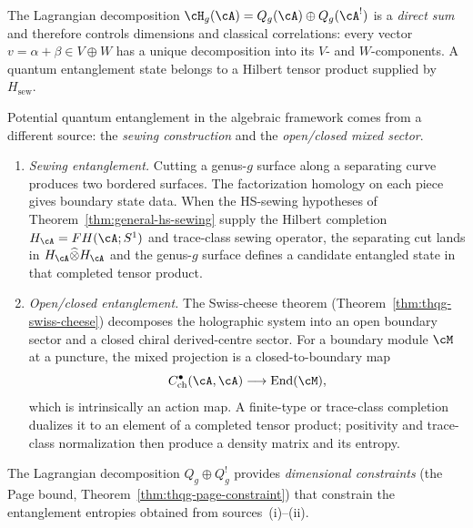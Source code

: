 \begin{remark}
\label{rem:thqg-two-entanglements}
The Lagrangian decomposition
$\cH_g(\cA) = Q_g(\cA) \oplus Q_g(\cA^!)$
is a \emph{direct sum} and therefore controls dimensions and
classical correlations:
every vector $v = \alpha+\beta \in V\oplus W$ has a unique
decomposition into its $V$- and $W$-components.  A quantum
entanglement state belongs to a Hilbert tensor product supplied by
$H_{\mathrm{sew}}$.

Potential quantum entanglement in the algebraic framework
comes from a different source: the \emph{sewing construction}
and the \emph{open/closed mixed sector}.
\begin{enumerate}[label=\textup{(\roman*)}]
\item \emph{Sewing entanglement.}
 Cutting a genus-$g$ surface along a separating curve
 produces two bordered surfaces. The factorization homology
 on each piece gives boundary state data.  When the HS-sewing
 hypotheses of Theorem~\ref{thm:general-hs-sewing} supply the
 Hilbert completion $H_\cA=FH(\cA;S^1)$ and trace-class sewing
 operator, the separating cut lands in
 $H_\cA\widehat{\otimes}H_\cA$ and the genus-$g$ surface defines a
 candidate entangled state in that completed tensor product.

\item \emph{Open/closed entanglement.}
 The Swiss-cheese theorem
 (Theorem~\ref{thm:thqg-swiss-cheese}) decomposes the
 holographic system into an open boundary sector and a closed
 chiral derived-centre sector.  For a boundary module $\cM$ at
 a puncture, the mixed projection is a closed-to-boundary map
 \[
 C^\bullet_{\mathrm{ch}}(\cA,\cA)\longrightarrow
 \operatorname{End}(\cM),
 \]
 which is intrinsically an action map.  A finite-type or trace-class
 completion dualizes it to an element of a completed tensor product;
 positivity and trace-class normalization then produce a density
 matrix and its entropy.
\end{enumerate}
The Lagrangian decomposition $Q_g \oplus Q_g^!$ provides
\emph{dimensional constraints} (the Page bound,
Theorem~\ref{thm:thqg-page-constraint}) that constrain
the entanglement entropies obtained from sources~(i)--(ii).
\end{remark}

%
%

